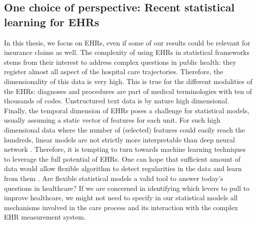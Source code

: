 \documentclass[french,12pt,twoside,a4paper]{book}
\begin{document}
\begin{background_box_left}


\end{background_box_left}


\subsection{One choice of perspective: Recent statistical learning for EHRs}%
\label{subsec:intro:focus_data}%

In this thesis, we focus on EHRs, even if some of our
results could be relevant for insurance claims as well. The complexity of using
EHRs in statistical frameworks stems from their interest to address complex
questions in public health: they register almost all aspect of the hospital care
trajectories. Therefore, the dimensionality of this data is very high. This is
true for the different modalities of the EHRs: diagnoses and procedures are part
of medical terminologies with ten of thousands of codes. Unstructured text data
is by nature high dimensional. Finally, the temporal dimension of EHRs poses a
challenge for statistical models, usually assuming a static vector of features
for each unit.
For such high dimensional data where the number of (selected) features could
easily reach the hundreds, linear models are not strictly more interpretable
than deep neural network \citep{lipton2018mythos}. Therefore, it is tempting to
turn towards machine learning techniques to leverage the full potential of EHRs.
One can hope that sufficient amount of data would allow flexible algorithm to
detect regularities in the data and learn from them
\citep{halevy2009unreasonable}.
% 
Are flexible statistical models a valid tool to answer today's questions in
healthcare? If we are concerned in identifying which levers to pull to improve
healthcare, we might not need to specify in our statistical models all
mechanisms involved in the care process and its interaction with the complex EHR
measurement system.
\end{document}
